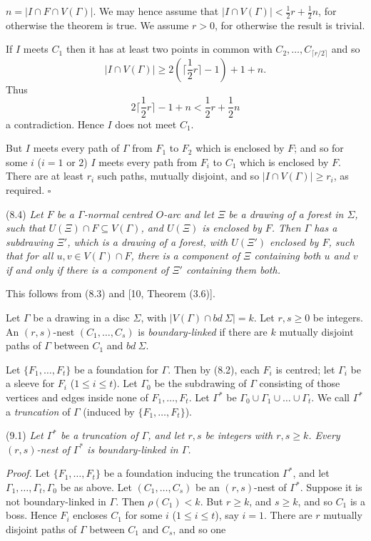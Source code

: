 \noindent $n = |I \cap F \cap V(\Gamma)|$. We may hence assume that $|I \cap V(\Gamma)| < \frac{1}{2}r + \frac{1}{2}n$, for otherwise the theorem is true. We assume $r > 0$, for otherwise the result is trivial.

If $I$ meets $C_1$ then it has at least two points in common with $C_2, \dots, C_{\lceil r/2 \rceil}$ and so
\begin{equation*}
|I \cap V(\Gamma)| \ge 2(\lceil \frac{1}{2}r \rceil - 1) + 1 + n.
\end{equation*}
Thus
\begin{equation*}
2\lceil \frac{1}{2}r \rceil - 1 + n < \frac{1}{2}r + \frac{1}{2}n
\end{equation*}
a contradiction. Hence $I$ does not meet $C_1$.

But $I$ meets every path of $\Gamma$ from $F_1$ to $F_2$ which is enclosed by $F$; and so for some $i$ ($i = 1$ or $2$) $I$ meets every path from $F_i$ to $C_1$ which is enclosed by $F$. There are at least $r_i$ such paths, mutually disjoint, and so $|I \cap V(\Gamma)| \ge r_i$, as required. $\square$

\stmt
(8.4) \textit{Let $F$ be a $\Gamma$-normal centred $O$-arc and let $\Xi$ be a drawing of a forest in $\Sigma$, such that $U(\Xi) \cap F \subseteq V(\Gamma)$, and $U(\Xi)$ is enclosed by $F$. Then $\Gamma$ has a subdrawing $\Xi'$, which is a drawing of a forest, with $U(\Xi')$ enclosed by $F$, such that for all $u, v \in V(\Gamma) \cap F$, there is a component of $\Xi$ containing both $u$ and $v$ if and only if there is a component of $\Xi'$ containing them both.}

This follows from (8.3) and [10, Theorem (3.6)].


Let $\Gamma$ be a drawing in a disc $\Sigma$, with $|V(\Gamma) \cap bd\ \Sigma| = k$. Let $r, s \ge 0$ be integers. An $(r, s)$-nest $(C_1, \dots, C_s)$ is \textit{boundary-linked} if there are $k$ mutually disjoint paths of $\Gamma$ between $C_1$ and $bd\ \Sigma$.

Let $\{F_1, \dots, F_t\}$ be a foundation for $\Gamma$. Then by (8.2), each $F_i$ is centred; let $\Gamma_i$ be a sleeve for $F_i$ ($1 \le i \le t$). Let $\Gamma_0$ be the subdrawing of $\Gamma$ consisting of those vertices and edges inside none of $F_1, \dots, F_t$. Let $\Gamma^*$ be $\Gamma_0 \cup \Gamma_1 \cup \dots \cup \Gamma_t$. We call $\Gamma^*$ a \textit{truncation} of $\Gamma$ (induced by $\{F_1, \dots, F_t\}$).

\stmt
(9.1) \textit{Let $\Gamma^*$ be a truncation of $\Gamma$, and let $r, s$ be integers with $r, s \ge k$. Every $(r, s)$-nest of $\Gamma^*$ is boundary-linked in $\Gamma$.}

\textit{Proof.} Let $\{F_1, \dots, F_t\}$ be a foundation inducing the truncation $\Gamma^*$, and let $\Gamma_1, \dots, \Gamma_t, \Gamma_0$ be as above. Let $(C_1, \dots, C_s)$ be an $(r, s)$-nest of $\Gamma^*$. Suppose it is not boundary-linked in $\Gamma$. Then $\rho(C_1) < k$. But $r \ge k$, and $s \ge k$, and so $C_1$ is a boss. Hence $F_i$ encloses $C_1$ for some $i$ ($1 \le i \le t$), say $i = 1$. There are $r$ mutually disjoint paths of $\Gamma$ between $C_1$ and $C_s$, and so one
